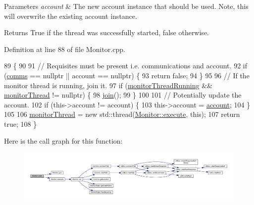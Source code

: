 \begin{DoxyParams}{Parameters}
{\em account} & The new account instance that should be used. Note, this will overwrite the existing account instance. \\
\hline
\end{DoxyParams}
\begin{DoxyReturn}{Returns}
True if the thread was successfully started, false otherwise. 
\end{DoxyReturn}


Definition at line 88 of file Monitor.\+cpp.


\begin{DoxyCode}
89 \{
90 
91     \textcolor{comment}{// Requisites must be present i.e. communications and account.}
92     \textcolor{keywordflow}{if} (\hyperlink{class_monitor_a42fffadeba33ae6080b1d95783ca703b}{comms} == \textcolor{keyword}{nullptr} || account == \textcolor{keyword}{nullptr}) \{
93         \textcolor{keywordflow}{return} \textcolor{keyword}{false};
94     \}
95 
96     \textcolor{comment}{// If the monitor thread is running, join it.}
97     \textcolor{keywordflow}{if} (\hyperlink{class_monitor_a63d26dffb146b9cfd0705163f3dc4745}{monitorThreadRunning} && \hyperlink{class_monitor_a1e6bfb7c47a223d8bdc537e2cff07822}{monitorThread} != \textcolor{keyword}{nullptr}) \{
98         \hyperlink{class_monitor_a2d2e309666c98333a317c9786f94f6ad}{join}();
99     \}
100 
101     \textcolor{comment}{// Potentially update the account.}
102     \textcolor{keywordflow}{if} (this->account != account) \{
103         this->account = \hyperlink{class_monitor_acacff99178fbcd9eae50801acc346bf4}{account};
104     \}
105 
106     \hyperlink{class_monitor_a1e6bfb7c47a223d8bdc537e2cff07822}{monitorThread} = \textcolor{keyword}{new} std::thread(\hyperlink{class_monitor_a79e0c78d0973bee48418aedf3aedb2ba}{Monitor::execute}, \textcolor{keyword}{this});
107     \textcolor{keywordflow}{return} \textcolor{keyword}{true};
108 \}
\end{DoxyCode}
Here is the call graph for this function\+:\nopagebreak
\begin{figure}[H]
\begin{center}
\leavevmode
\includegraphics[width=350pt]{d9/df7/class_monitor_a5a01b1c1084f0826a01c184519491cf6_cgraph}
\end{center}
\end{figure}
\mbox{\label{class_monitor_a13fb20dc3bd5c8739f5a820cf7433cd8}} 
